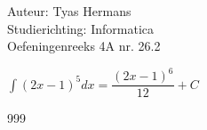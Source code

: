 \documentclass[a4paper]{article}
\newcommand{\dint}{\displaystyle\int}
\begin{document}
  
\noindent \large Auteur: Tyas Hermans \\
\noindent \large Studierichting: Informatica\\
\noindent \large Oefeningenreeks 4A nr. 26.2 \\

\medskip

\normalsize

$\dint (2x-1)^5dx = \dfrac{(2x-1)^6}{12} + C$\\

\begin{thebibliography}{999}
\end{thebibliography}
\end{document}
